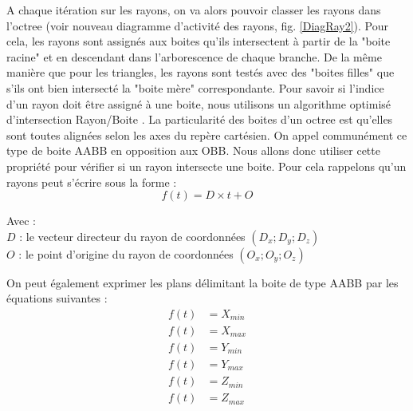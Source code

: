  A chaque itération sur les rayons, on va alors pouvoir classer les rayons dans l'\gls{octree} (voir nouveau diagramme d'activité des rayons, fig. \ref{DiagRay2}). Pour cela, les rayons sont assignés aux boites qu'ils intersectent à partir de la "boite racine" et en descendant dans l'arborescence de chaque branche. De la même manière que pour les triangles, les rayons sont testés avec des "boites filles" que s'ils ont bien intersecté la "boite mère" correspondante. Pour savoir si l'indice d'un rayon doit être assigné à une boite, nous utilisons un algorithme optimisé d'intersection Rayon/Boite \cite{AABB}. La particularité des boites d'un \gls{octree} est qu'elles sont toutes alignées selon les axes du repère cartésien. On appel communément ce type de boite \gls{AABB} en opposition aux \gls{OBB}. Nous allons donc utiliser cette propriété pour vérifier si un rayon intersecte une boite. Pour cela rappelons qu'un rayons peut s'écrire sous la forme : 
\begin{equation}
f(t) = D \times t + O
\end{equation}

Avec : \\
$D$ : le vecteur directeur du rayon de coordonnées $(D_x ; D_y ; D_z)$ \\
$O$ : le point d'origine du rayon de coordonnées $(O_x ; O_y ; O_z)$

On peut également exprimer les plans délimitant la boite de type \gls{AABB} par les équations suivantes :
\begin{align}
f(t) &= X_{min}  \\
f(t) &= X_{max}  \\
f(t) &= Y_{min}  \\
f(t) &= Y_{max} \\
f(t) &= Z_{min} \\
f(t) &= Z_{max}
\end{align}



